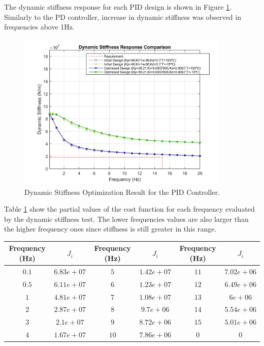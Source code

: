 The  dynamic stiffness response for each PID design is shown in Figure \ref{fig:5_2_4_PID_DynStif}. Similarly to the PD controller, increase in dynamic stiffness was observed in frequencies above 1Hz.

\begin{figure}[H]
	\centering
	\centerline{\includegraphics[width=0.9\textwidth]{Figuras/5.OptimizationResults/5-2-4-PID-DynamicStiffnessComparison.jpg}}
	\caption{Dynamic Stiffness Optimization Result for the PID Controller.}
	\label{fig:5_2_4_PID_DynStif}
\end{figure}

Table \ref{table:5_2_4_PID_CostFunctionTable} show the partial values of the cost function for each frequency evaluated by the dynamic stiffness test. The lower frequencies values are also larger than the higher frequency ones since stiffness is still greater in this range. 

\begin{table}[H]
	\label{table:5_2_4_PID_CostFunctionTable}
	\centering
	\resizebox{14cm}{!} {
		\begin{tabular}{|c|c|c|c|c|c|}
			\hline
			Frequency (Hz) & $J_i$ & Frequency (Hz) & $J_i$ & Frequency (Hz) & $J_i$ \\ \hline
			$0.1$ & $6.83e+07$ & $5$ & $1.42e+07$ & $11$ & $7.02e+06$ \\ \hline
			$0.5$ & $6.11e+07$ & $6$ & $1.23e+07$ & $12$ & $6.49e+06$ \\ \hline
			$1$ & $4.81e+07$ & $7$ & $1.08e+07$ & $13$ & $6e+06$ \\ \hline
			$2$ & $2.87e+07$ & $8$ & $9.7e+06$ & $14$ & $5.54e+06$ \\ \hline
			$3$ & $2.1e+07$ & $9$ & $8.72e+06$ & $15$ & $5.01e+06$ \\ \hline
			$4$ & $1.67e+07$ & $10$ & $7.86e+06$ & $0$ & $0$ \\ \hline
	\end{tabular}}
\end{table}

